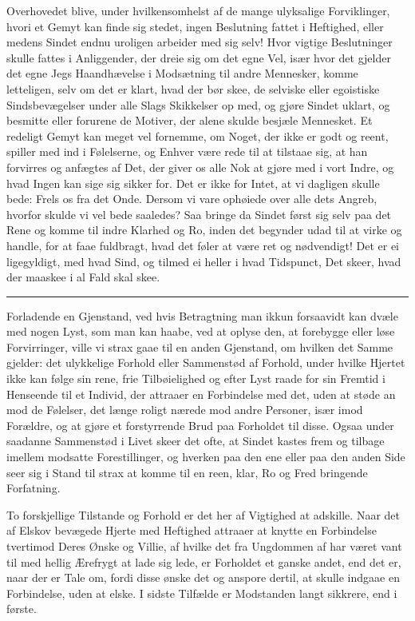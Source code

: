 \documentclass[12pt,a4paper]{book}
\newcommand{\apage}[1]{\marginnote{\footnotesize\textit{[#1]}}}
\begin{document}
Overhovedet blive, under hvilkensomhelst af de mange ulyksalige
Forviklinger, hvori et Gemyt kan finde sig stedet, ingen Beslutning
fattet i Heftighed, eller medens Sindet endnu uroligen arbeider med sig
\apage{150} selv! Hvor vigtige Beslutninger skulle fattes i Anliggender, der dreie
sig om det egne Vel, især hvor det gjelder det egne Jegs Haandhævelse i
Modsætning til andre Mennesker, komme letteligen, selv om det er klart,
hvad der bør skee, de selviske eller egoistiske Sindsbevægelser under
alle Slags Skikkelser op med, og gjøre Sindet uklart, og besmitte eller
forurene de Motiver, der alene skulde besjæle Mennesket. Et redeligt
Gemyt kan meget vel fornemme, om Noget, der ikke er godt og reent,
spiller med ind i Følelserne, og Enhver være rede til at tilstaae sig, at
han forvirres og anfægtes af Det, der giver os alle Nok at gjøre med i
vort Indre, og hvad Ingen kan sige sig sikker for. Det er ikke for Intet,
at vi dagligen skulle bede: Frels os fra det Onde. Dersom vi vare
ophøiede over alle dets Angreb, hvorfor skulde vi vel bede saaledes? Saa
bringe da Sindet først sig selv paa det Rene og komme til indre Klarhed
og Ro, inden det begynder udad til at virke og handle, for at faae
fuldbragt, hvad det føler at være ret og nødvendigt! Det er ei
ligegyldigt, med hvad Sind, og tilmed ei heller i hvad Tidspunct, Det
skeer, hvad der maaskee i al Fald skal skee.

\begin{center}\rule{0.28\linewidth}{0.4pt}\end{center}

Forladende en Gjenstand, ved hvis Betragtning man ikkun forsaavidt kan
dvæle med nogen Lyst, som man kan haabe, ved at oplyse den, at forebygge
eller løse Forvirringer, ville vi strax gaae til en anden \apage{151} Gjenstand, om
hvilken det Samme gjelder: det ulykkelige Forhold eller Sammenstød af
Forhold, under hvilke Hjertet ikke kan følge sin rene, frie Tilbøielighed
og efter Lyst raade for sin Fremtid i Henseende til et Individ, der
attraaer en Forbindelse med det, uden at støde an mod de Følelser, det
længe roligt nærede mod andre Personer, især imod Forældre, og at gjøre
et forstyrrende Brud paa Forholdet til disse. Ogsaa under saadanne
Sammenstød i Livet skeer det ofte, at Sindet kastes frem og tilbage
imellem modsatte Forestillinger, og hverken paa den ene eller paa den
anden Side seer sig i Stand til strax at komme til en reen, klar, Ro og
Fred bringende Forfatning.

To forskjellige Tilstande og Forhold er det her af Vigtighed at adskille.
Naar det af Elskov bevægede Hjerte med Heftighed attraaer at knytte en
Forbindelse tvertimod Deres Ønske og Villie, af hvilke det fra Ungdommen
af har været vant til med hellig Ærefrygt at lade sig lede, er Forholdet
et ganske andet, end det er, naar der er Tale om, fordi disse ønske det
og anspore dertil, at skulle indgaae en Forbindelse, uden at elske. I
sidste Tilfælde er Modstanden langt sikkrere, end i første.
\end{document}

